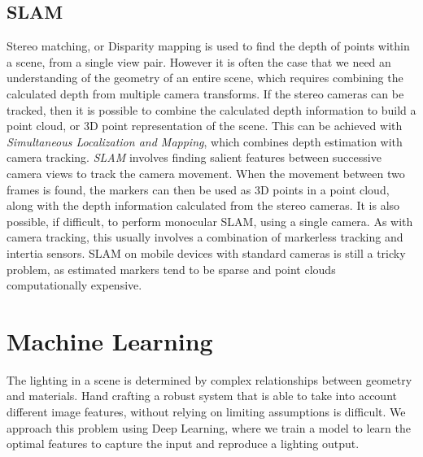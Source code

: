 \documentclass[ %
                    author={Gavin Parker},
                supervisor={Dr. Neill Campbell},
                    degree={MEng},
                     title={Deep Siamese Networks for Illumination Estimation from Stereo Images},
                  subtitle={},
                      type={Research},
                      year={2018} ]{dissertation}
\begin{document}
\subsection{SLAM}
Stereo matching, or Disparity mapping is used to find the depth of points within a scene, from a single view pair. However it is often the case that we need an understanding of the geometry of an entire scene, which requires combining the calculated depth from multiple camera transforms. If the stereo cameras can be tracked, then it is possible to combine the calculated depth information to build a point cloud, or 3D point representation of the scene. This can be achieved with \textit{Simultaneous Localization and Mapping}, which combines depth estimation with camera tracking. \textit{SLAM} involves finding salient features between successive camera views to track the camera movement. When the movement between two frames is found, the markers can then be used as 3D points in a point cloud, along with the depth information calculated from the stereo cameras. It is also possible, if difficult, to perform monocular SLAM, using a single camera. As with camera tracking, this usually involves a combination of markerless tracking and intertia sensors. SLAM on mobile devices with standard cameras is still a tricky problem, as estimated markers tend to be sparse and point clouds computationally expensive.
\section{Machine Learning}
The lighting in a scene is determined by complex relationships between geometry and materials. Hand crafting a robust system that is able to take into account different image features, without relying on limiting assumptions is difficult. We approach this problem using Deep Learning, where we train a model to learn the optimal features to capture the input and reproduce a lighting output.
\newline
\end{document}
